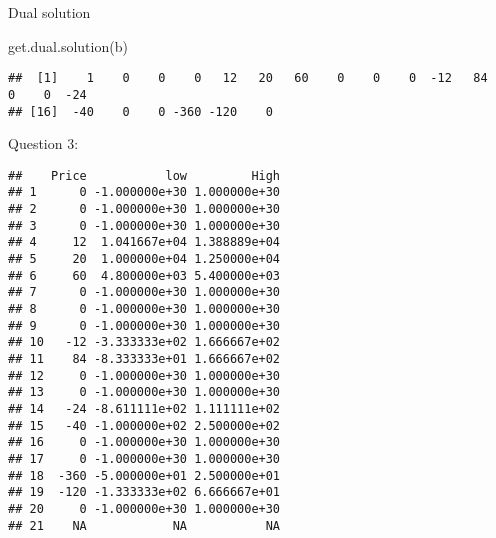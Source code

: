 \documentclass[
]{article}
\newenvironment{Shaded}{\begin{snugshade}}{\end{snugshade}}
\newcommand{\DecValTok}[1]{\textcolor[rgb]{0.00,0.00,0.81}{#1}}
\newcommand{\FunctionTok}[1]{\textcolor[rgb]{0.00,0.00,0.00}{#1}}
\newcommand{\NormalTok}[1]{#1}
\newcommand{\OtherTok}[1]{\textcolor[rgb]{0.56,0.35,0.01}{#1}}
\newcommand{\SpecialCharTok}[1]{\textcolor[rgb]{0.00,0.00,0.00}{#1}}
\newcommand{\StringTok}[1]{\textcolor[rgb]{0.31,0.60,0.02}{#1}}
\begin{document}
Dual solution

\begin{Shaded}
\begin{Highlighting}[]
\FunctionTok{get.dual.solution}\NormalTok{(b)}
\end{Highlighting}
\end{Shaded}

\begin{verbatim}
##  [1]    1    0    0    0   12   20   60    0    0    0  -12   84    0    0  -24
## [16]  -40    0    0 -360 -120    0
\end{verbatim}

Question 3:

\begin{Shaded}
\end{Shaded}

\begin{verbatim}
##    Price           low         High
## 1      0 -1.000000e+30 1.000000e+30
## 2      0 -1.000000e+30 1.000000e+30
## 3      0 -1.000000e+30 1.000000e+30
## 4     12  1.041667e+04 1.388889e+04
## 5     20  1.000000e+04 1.250000e+04
## 6     60  4.800000e+03 5.400000e+03
## 7      0 -1.000000e+30 1.000000e+30
## 8      0 -1.000000e+30 1.000000e+30
## 9      0 -1.000000e+30 1.000000e+30
## 10   -12 -3.333333e+02 1.666667e+02
## 11    84 -8.333333e+01 1.666667e+02
## 12     0 -1.000000e+30 1.000000e+30
## 13     0 -1.000000e+30 1.000000e+30
## 14   -24 -8.611111e+02 1.111111e+02
## 15   -40 -1.000000e+02 2.500000e+02
## 16     0 -1.000000e+30 1.000000e+30
## 17     0 -1.000000e+30 1.000000e+30
## 18  -360 -5.000000e+01 2.500000e+01
## 19  -120 -1.333333e+02 6.666667e+01
## 20     0 -1.000000e+30 1.000000e+30
## 21    NA            NA           NA
\end{verbatim}
\end{document}
